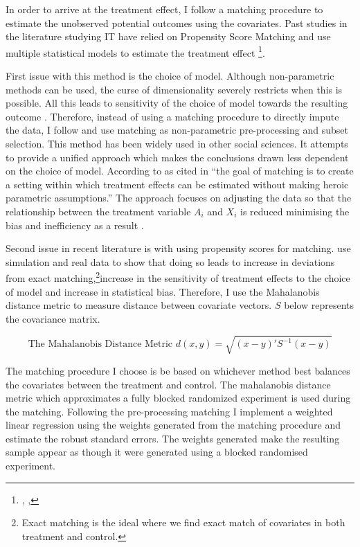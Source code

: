 \documentclass[12pt]{article}
\begin{document}
In order to arrive at the treatment effect, I follow a matching procedure to estimate the unobserved potential outcomes using the covariates. Past studies in the literature studying IT have relied on Propensity Score Matching and use multiple statistical models to estimate the treatment effect \footnote{\cite{RN4}, \cite{RN13},\cite{RN34}}.  

First issue with this method is the choice of model. Although non-parametric methods can be used, the curse of dimensionality severely restricts when this is possible. All this leads to sensitivity of the choice of model towards the resulting outcome \citep{RN29}. Therefore, instead of using a matching procedure to directly impute the data, I follow \cite{RN29} and use matching as non-parametric pre-processing and subset selection. This method has been widely used in other social sciences.  It attempts to provide a unified approach which makes the conclusions drawn less dependent on the choice of model. According to \cite{RN37} as cited in \cite{RN26}  ``the goal of matching is to create a setting within which treatment effects can be estimated without making heroic parametric assumptions.'' The approach focuses on adjusting the data so that the relationship between the treatment variable $A_{i}$ and $X_{i}$ is reduced minimising the bias and inefficiency as a result \citep{RN29}.

Second issue in recent literature is with using propensity scores for matching. \cite{RN26} use simulation and real data to show that doing so leads to increase in deviations from exact matching,\footnote{Exact matching is the ideal where we find exact match of covariates in both treatment and control.}increase in the sensitivity of treatment effects to the choice of model and increase in statistical bias. Therefore, I use the Mahalanobis distance metric to measure distance between covariate vectors. $S$ below represents the covariance matrix.

\[\text{The Mahalanobis Distance Metric } d(x,y) = \sqrt{(x - y)'S^{-1}(x - y)} \]

The matching procedure I choose is be based on whichever method best balances the covariates between the treatment and control. The mahalanobis distance metric which approximates a fully blocked randomized experiment is used during the matching. Following the pre-processing matching I implement a weighted linear regression using the weights generated from the matching procedure and estimate the robust standard errors. The weights generated make the resulting sample appear as though it were generated using a blocked randomised experiment.
\end{document}
